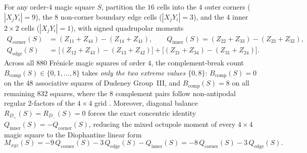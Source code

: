 \begin{proposition}
\label{prop:octupole_census}
For any order-$4$ magic square $S$, partition the $16$ cells into the $4$ outer corners ($|X_j Y_i| = 9$), the $8$ non-corner boundary edge cells ($|X_j Y_i| = 3$), and the $4$ inner $2\times 2$ cells ($|X_j Y_i| = 1$), with signed quadrupolar moments
\begin{align}
  Q_{\mathrm{corner}}(S) &= (Z_{11} + Z_{44}) - (Z_{14} + Z_{41}), \qquad
  Q_{\mathrm{inner}}(S) = (Z_{22} + Z_{33}) - (Z_{23} + Z_{32}), \nonumber\\
  Q_{\mathrm{edge}}(S) &= \bigl[(Z_{12} + Z_{43}) - (Z_{13} + Z_{42})\bigr] + \bigl[(Z_{21} + Z_{34}) - (Z_{31} + Z_{24})\bigr].
  \label{eq:shell_quadrupoles}
\end{align}
Across all $880$ Fr\'enicle magic squares of order $4$, the complement-break count $B_{\mathrm{comp}}(S) \in \{0,1,\dots,8\}$ takes \emph{only the two extreme values $\{0, 8\}$}: $B_{\mathrm{comp}}(S) = 0$ on the $48$ associative squares of Dudeney Group~III, and $B_{\mathrm{comp}}(S) = 8$ on all remaining $832$ squares, where the $8$ complement pairs follow non-antipodal regular $2$-factors of the $4\times 4$ grid \cite{dudeney1917amusements}. Moreover, diagonal balance $R_{D_+}(S) = R_{D_-}(S) = 0$ forces the exact concentric identity $Q_{\mathrm{inner}}(S) = -Q_{\mathrm{corner}}(S)$, reducing the mixed octupole moment of every $4\times 4$ magic square to the Diophantine linear form
\begin{equation}
  M_{xyz}(S) = -9\,Q_{\mathrm{corner}}(S) - 3\,Q_{\mathrm{edge}}(S) - Q_{\mathrm{inner}}(S) = -8\,Q_{\mathrm{corner}}(S) - 3\,Q_{\mathrm{edge}}(S).
  \label{eq:octupole_shell_identity}
\end{equation}

\end{proposition}
